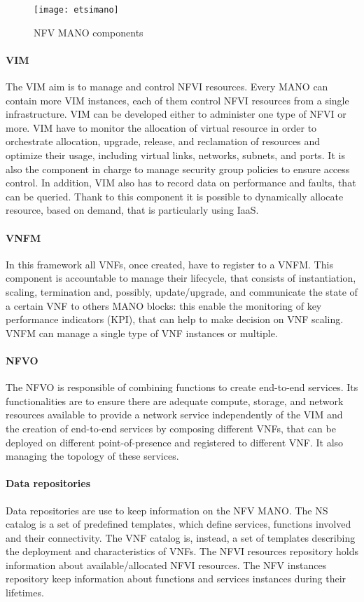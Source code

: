 \begin{figure}
  \centering
  \texttt{[image: etsimano]}
  \caption{NFV MANO components}
  \label{chap:background:img:etsimano}
\end{figure}


\paragraph*{VIM}
The VIM aim is to manage and control NFVI resources. Every MANO can contain more
VIM instances, each of them control NFVI resources from a single infrastructure.
VIM can be developed either to administer one type of NFVI or more. VIM have to
monitor the allocation of virtual resource in order to orchestrate allocation,
upgrade, release, and reclamation of resources and optimize their usage,
including virtual links, networks, subnets, and ports. It is also the component
in charge to manage security group policies to ensure access control. In
addition, VIM also has to record data on performance and faults, that can be
queried. Thank to this component it is possible to dynamically allocate
resource, based on demand, that is particularly using IaaS.

\paragraph*{VNFM} 
In this framework all VNFs, once created, have to register to a VNFM. This
component is accountable to manage their lifecycle, that consists of
instantiation, scaling, termination and, possibly, update/upgrade, and
communicate the state of a certain VNF to others MANO blocks: this enable the
monitoring of key performance indicators (KPI), that can help to make decision
on VNF scaling. VNFM can manage a single type of VNF instances or multiple.

\paragraph*{NFVO}
The NFVO is responsible of combining functions to create end-to-end services.
Its functionalities are to ensure there are adequate compute, storage, and
network resources available to provide a network service independently of the
VIM and the creation of end-to-end services by composing different VNFs, that
can be deployed on different point-of-presence and registered to different VNF.
It also managing the topology of these services. 

\paragraph*{Data repositories} Data repositories are use to keep information on
the NFV MANO. The NS catalog is a set of predefined templates, which define
services, functions involved and their connectivity. The VNF catalog is,
instead, a set of templates describing the deployment and characteristics of
VNFs. The NFVI resources repository holds information about available/allocated
NFVI resources. The NFV instances repository keep information about functions
and services instances during their lifetimes.

